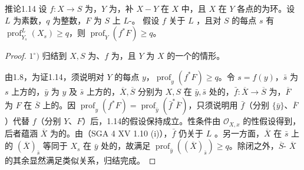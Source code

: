 \begin{SGAresult}{推论}{1.14}
设 $f:X\to S$ 为，$Y$ 为，补 $X-Y$ 在 $X$ 中，且 $X$ 在 $Y$ 各点的为环。设 $L$ 为素数，$q$ 为整数，$F$ 为 $S$ 上 $L$-。
假设 $f$ 关于 $L$ ，且对 $S$ 的每点 $s$ 有 $\operatorname{prof}_{Y_s}^L(X_s)\geq q$，则 $\operatorname{prof}_Y(f^*F)\geq q$。
\end{SGAresult}
\begin{proof}
$1^\circ)$ 归结到 $X,S$ 为、$f$ 为，且 $Y$ 为 $X$ 的一个的情形。

由1.8，为证1.14，须说明对 $Y$ 的每点 $y$，$\operatorname{prof}_y(f^*F)\geq q$。令 $s=f(y)$，$\bar s$ 为 $s$ 上方的，$\bar y$ 为 $y$ 及 $\bar s$ 上方的，$\overline X,\overline S$ 分别为 $X,S$ 在 $\bar y,\bar s$ 处的，$\bar f:\overline X\to\overline S$ 为，$\overline F$ 为 $F$ 在 $\overline S$ 上的。因 $\operatorname{prof}_y(f^*F)=\operatorname{prof}_{\bar y}(\bar f^*\overline F)$，只须说明用 $\bar f$（分别 $\{\bar y\}$、$\overline F$）代替 $f$（分别 $Y$、$F$）后，1.14的假设保持成立。性条件由 $\mathcal O_{X,x}$ 的性假设得到，后者蕴涵 $\overline X$ 为的。由（SGA 4 XV 1.10 (i)），$\bar f$ 仍关于 $L$ 。另一方面，$\overline X$ 在 $\bar s$ 上的 $(\overline X)_{\bar s}$ 等同于 $X_s$ 在 $\bar y$ 处的，故满足 $\operatorname{prof}_{\bar y}((\overline X)_{\bar s})\geq q$。除闭之外，$\overline S$- $\overline X$ 的其余显然满足类似关系，归结完成。


\end{proof}
